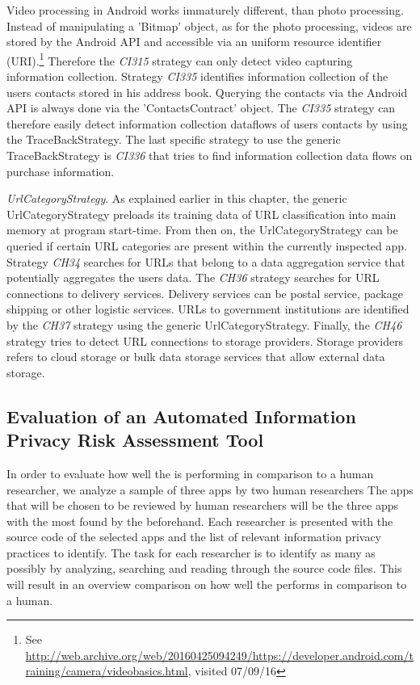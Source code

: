 Video processing in Android works immaturely different, than photo processing.
Instead of manipulating a 'Bitmap' object, as for the photo processing, videos are stored by the Android API and accessible via an uniform resource identifier (\acs{URI}).\footnote{\raggedright See \url{http://web.archive.org/web/20160425094249/https://developer.android.com/training/camera/videobasics.html}, visited 07/09/16}
Therefore the \textit{CI315} strategy can only detect video capturing information collection.
Strategy \textit{CI335} identifies information collection of the users contacts stored in his address book.
Querying the contacts via the Android API is always done via the 'ContactsContract' object.
The \textit{CI335} strategy can therefore easily detect information collection dataflows of users contacts by using the TraceBackStrategy.
The last specific strategy to use the generic TraceBackStrategy is \textit{CI336} that tries to find information collection data flows on purchase information.

\textit{UrlCategoryStrategy}.
As explained earlier in this chapter, the generic UrlCategoryStrategy preloads its training data of \acs{URL} classification into main memory at program start-time.
From then on, the UrlCategoryStrategy can be queried if certain URL categories are present within the currently inspected app. 
Strategy \textit{CH34} searches for URLs that belong to a data aggregation service that potentially aggregates the users data.
The \textit{CH36} strategy searches for URL connections to delivery services.
Delivery services can be postal service, package shipping or other logistic services.
URLs to government institutions are identified by the \textit{CH37} strategy using the generic UrlCategoryStrategy.
Finally, the \textit{CH46} strategy tries to detect URL connections to storage providers.
Storage providers refers to cloud storage or bulk data storage services that allow external data storage.

\subsection{Evaluation of an Automated Information Privacy Risk Assessment Tool}\label{chapter:evaluationMethods}

In order to evaluate how well the \aiprat is performing in comparison to a human researcher, we analyze a sample of three apps by two human researchers
The apps that will be chosen to be reviewed by human researchers will be the three apps with the most \ipr found by the \aiprat beforehand.
Each researcher is presented with the source code of the selected apps and the list of relevant information privacy practices to identify.
The task for each researcher is to identify as many \ipp as possibly by analyzing, searching and reading through the source code files. 
This will result in an overview comparison on how well the \aiprat performs in comparison to a human.

